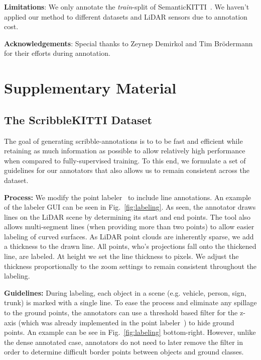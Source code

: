 \documentclass[10pt,twocolumn,letterpaper]{article}
\begin{document}
\noindent \textbf{Limitations}: We only annotate the \textit{train}-split of SemanticKITTI~\cite{iccv2019semantickitti}. We haven't applied our method to different datasets and LiDAR sensors due to annotation cost.

\noindent \textbf{Acknowledgements}: Special thanks to Zeynep Demirkol and Tim Br\"odermann for their efforts during annotation.


\clearpage
{\small


}
\clearpage

\section{Supplementary Material}

\subsection{The ScribbleKITTI Dataset}

The goal of generating scribble-annotations is to to be fast and efficient while retaining as much information as possible to allow relatively high performance when compared to fully-supervised training. To this end, we formulate a set of guidelines for our annotators that also allows us to remain consistent across the dataset.

\noindent \textbf{Process: } We modify the point labeler~\cite{iccv2019semantickitti} to include line annotations. An example of the labeler GUI can be seen in Fig.~\ref{fig:labeling}. As seen, the annotator draws lines on the LiDAR scene by determining its start and end points. The tool also allows multi-segment lines (when providing more than two points) to allow easier labeling of curved surfaces. As LiDAR point clouds are inherently sparse, we add a thickness to the drawn line. All points, who's projections fall onto the thickened line, are labeled. At  height we set the line thickness to  pixels. We adjust the thickness proportionally to the zoom settings to remain consistent throughout the labeling.

\noindent \textbf{Guidelines: } During labeling, each object in a scene (e.g. vehicle, person, sign, trunk) is marked with a single line. To ease the process and eliminate any spillage to the ground points, the annotators can use a threshold based filter for the z-axis (which was already implemented in the point labeler~\cite{iccv2019semantickitti}) to hide ground points. An example can be see in Fig.~\ref{fig:labeling} bottom-right. However, unlike the dense annotated case, annotators do not need to later remove the filter in order to determine difficult border points between objects and ground classes. 
\end{document}
